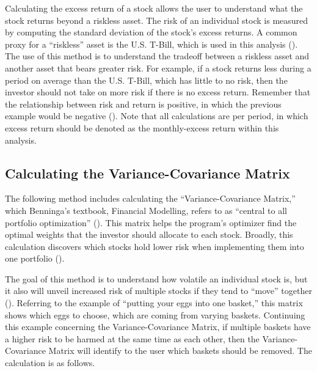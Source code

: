 \documentclass[12pt,english]{article}
\begin{document}
                \begin{doublespace}
            
            \indent{}\indent{}
            Calculating the excess return of a stock allows the user to understand what the stock returns beyond a riskless asset. The risk of an individual stock is measured by computing the standard deviation of the stock's excess returns. A common proxy for a “riskless” asset is the U.S. T-Bill, which is used in this analysis (\citet{Simon2008}). The use of this method is to understand the tradeoff between a riskless asset and another asset that bears greater risk. For example, if a stock returns less during a period on average than the U.S. T-Bill, which has little to no risk, then the investor should not take on more risk if there is no excess return. Remember that the relationship between risk and return is positive, in which the previous example would be negative (\citet{Simon2008}). Note that all calculations are per period, in which excess return should be denoted as the monthly-excess return within this analysis. 
        
        \subsection{Calculating the Variance-Covariance Matrix}
        
            \indent{}\indent{}
        	The following method includes calculating the “Variance-Covariance Matrix,” which Benninga’s textbook, Financial Modelling, refers to as “central to all portfolio optimization” (\citet{Simon2008}). This matrix helps the program’s optimizer find the optimal weights that the investor should allocate to each stock. Broadly, this calculation discovers which stocks hold lower risk when implementing them into one portfolio (\citet{Simon2008}). 
            
            \indent{}\indent{}
        	The goal of this method is to understand how volatile an individual stock is, but it also will unveil increased risk of multiple stocks if they tend to “move” together (\citet{Simon2008}). Referring to the example of “putting your eggs into one basket,” this matrix shows which eggs to choose, which are coming from varying baskets. Continuing this example concerning the Variance-Covariance Matrix, if multiple baskets have a higher risk to be harmed at the same time as each other, then the Variance-Covariance Matrix will identify to the user which baskets should be removed. The calculation is as follows.
            
                \end{doublespace}    
\end{document}
